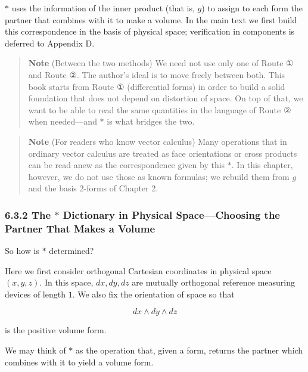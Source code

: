 \documentclass[a4paper,12pt,openany]{book}
\begin{document}
\(\ast\) uses the information of the inner product (that is, \(g\)) to
assign to each form the partner that combines with it to make a volume.
In the main text we first build this correspondence in the basis of
physical space; verification in components is deferred to Appendix D.

\begin{quote}
\textbf{Note} (Between the two methods) We need not use only one of
Route ① and Route ②. The author's ideal is to move freely between both.
This book starts from Route ① (differential forms) in order to build a
solid foundation that does not depend on distortion of space. On top of
that, we want to be able to read the same quantities in the language of
Route ② when needed—and \(\ast\) is what bridges the two.
\end{quote}

\begin{quote}
\textbf{Note} (For readers who know vector calculus) Many operations
that in ordinary vector calculus are treated as face orientations or
cross products can be read anew as the correspondence given by this
\(\ast\). In this chapter, however, we do not use those as known
formulas; we rebuild them from \(g\) and the basis \(2\)-forms of
Chapter 2.
\end{quote}

\hypertarget{the-ast-dictionary-in-physical-spacechoosing-the-partner-that-makes-a-volume}{%
\subsubsection{\texorpdfstring{6.3.2 The \(\ast\) Dictionary in Physical
Space—Choosing the Partner That Makes a
Volume}{6.3.2 The \textbackslash ast Dictionary in Physical Space—Choosing the Partner That Makes a Volume}}\label{the-ast-dictionary-in-physical-spacechoosing-the-partner-that-makes-a-volume}}

So how is \(\ast\) determined?

Here we first consider orthogonal Cartesian coordinates in physical
space \((x,y,z)\). In this space, \(dx, dy, dz\) are mutually orthogonal
reference measuring devices of length \(1\). We also fix the orientation
of space so that

\[
dx \wedge dy \wedge dz
\]

is the positive volume form.

We may think of \(\ast\) as the operation that, given a form, returns
the partner which combines with it to yield a volume form.
\end{document}
